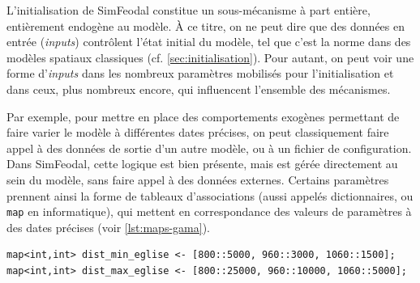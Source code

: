 L'initialisation de SimFeodal constitue un sous-mécanisme à part entière, entièrement endogène au modèle.
À ce titre, on ne peut dire que des données en entrée (\textit{inputs}) contrôlent l'état initial du modèle, tel que c'est la norme dans des modèles spatiaux classiques (cf. \cref{sec:initialisation}).
Pour autant, on peut voir une forme d'\textit{inputs} dans les nombreux paramètres mobilisés pour l'initialisation et dans ceux, plus nombreux encore, qui influencent l'ensemble des mécanismes.

Par exemple, pour mettre en place des comportements exogènes permettant de faire varier le modèle à différentes dates précises, on peut classiquement faire appel à des données de sortie d'un autre modèle, ou à un fichier de configuration.
Dans SimFeodal, cette logique est bien présente, mais est gérée directement au sein du modèle, sans faire appel à des données externes.
Certains paramètres prennent ainsi la forme de tableaux d'associations (aussi appelés dictionnaires, ou \og \texttt{map}\fg{} en informatique), qui mettent en correspondance des valeurs de paramètres à des dates précises (voir \cref{lst:maps-gama}).
\medskip

{\footnotesize
	\begin{lstlisting}[caption={
	Deux exemples de \texttt{map} dans Gama.
	\textit{À partir de 800, les églises doivent se situer entre 5 et 25~km, puis entre 3 et 10~km de 960 à 1060, et entre 1.5 et 5~km après cette date.}}, captionpos=b, label={lst:maps-gama}]
map<int,int> dist_min_eglise <- [800::5000, 960::3000, 1060::1500];
map<int,int> dist_max_eglise <- [800::25000, 960::10000, 1060::5000]; 
	\end{lstlisting}
}



